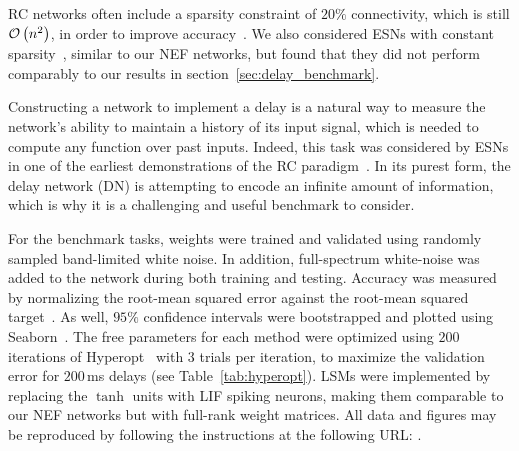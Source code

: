 RC networks often include a sparsity constraint of $20\%$ connectivity, which is still $\mathcal{O}\left({n^2}\right)$, in order to improve accuracy~\citep{lukovsevicius2012reservoir}.
We also considered ESNs with constant sparsity~\citep{lukovsevivcius2012practical}, similar to our NEF networks, but found that they did not perform comparably to our results in section~\ref{sec:delay_benchmark}.

Constructing a network to implement a delay is a natural way to measure the network's ability to maintain a history of its input signal, which is needed to compute any function over past inputs.
Indeed, this task was considered by ESNs in one of the earliest demonstrations of the RC paradigm~\citep{jaeger2002short}.  In its purest form, the delay network (DN) is attempting to encode an infinite amount of information, which is why it is a challenging and useful benchmark to consider.

For the benchmark tasks, weights were trained and validated using randomly sampled band-limited white noise.
In addition, full-spectrum white-noise was added to the network during both training and testing.
Accuracy was measured by normalizing the root-mean squared error against the root-mean squared target~\citep[NRMSE;][]{lukovsevicius2012reservoir}.
As well, $95\%$ confidence intervals were bootstrapped and plotted using Seaborn~\citep{michael_waskom_2015_19108}.
The free parameters for each method were optimized using $200$ iterations of Hyperopt~\citep{bergstra2013making} with $3$ trials per iteration, to maximize the validation error for $200$\,ms delays (see Table~\ref{tab:hyperopt}).
LSMs were implemented by replacing the $\tanh$ units with LIF spiking neurons, making them comparable to our NEF networks but with full-rank weight matrices.
All data and figures may be reproduced by following the instructions at the following URL: .

